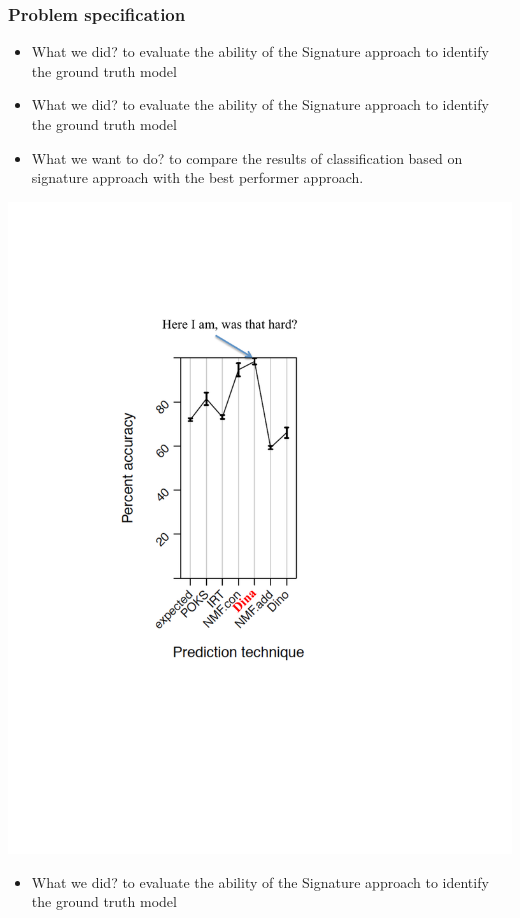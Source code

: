 \documentclass{beamer}
\begin{document}
\begin{frame}\frametitle{Problem specification}
\begin{overprint}
\begin{itemize}
	\item What we did? to evaluate the ability of the Signature approach to identify the ground truth model
	\end{itemize}
	\begin{itemize}
	\item What we did? to evaluate the ability of the Signature approach to identify the ground truth model
	\item What we want to do? to compare the results of classification based on signature approach with the best performer \small approach.
\end{itemize}
	\includegraphics[trim=3cm 10cm 5cm 5cm,scale=0.37]{images/BestPerformer.pdf}
\begin{itemize}
	\item What we did? to evaluate the ability of the Signature approach to identify the ground truth model

\end{itemize}
\end{overprint}
\end{frame}
\end{document}
